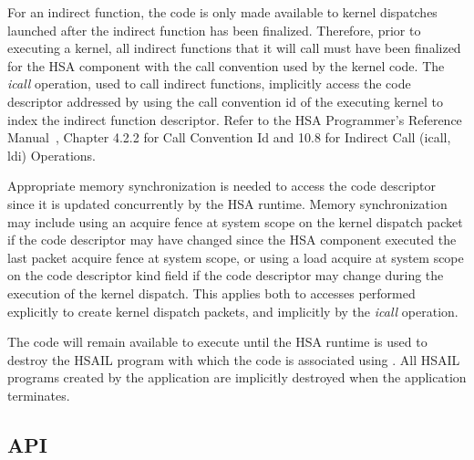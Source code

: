\documentclass[final]{book}
\newcommand{\reffld}[1]{\textit{#1}}
\begin{document}
For an indirect function, the code is only made available to kernel dispatches
launched after the indirect function has been finalized. Therefore, prior to
executing a kernel, all indirect functions that it will call must have been
finalized for the HSA component with the call convention used by the kernel
code. The \emph{icall} operation, used to call indirect functions, implicitly
access the code descriptor addressed by using the call convention id of the
executing kernel to index the indirect function descriptor. Refer to the HSA
Programmer's Reference Manual~\cite{prm}, Chapter 4.2.2 for Call Convention Id
and 10.8 for Indirect Call (icall, ldi) Operations.

Appropriate memory synchronization is needed to access the code descriptor since
it is updated concurrently by the HSA runtime. Memory synchronization may
include using an acquire fence at system scope on the kernel dispatch packet if
the code descriptor may have changed since the HSA component executed the last
packet acquire fence at system scope, or using a load acquire at system scope on
the code descriptor kind field if the code descriptor may change during the
execution of the kernel dispatch. This applies both to accesses performed
explicitly to create kernel dispatch packets, and implicitly by the \emph{icall}
operation.

The code will remain available to execute until the HSA runtime is used to
destroy the HSAIL program with which the code is associated using
. All HSAIL programs created by the application
are implicitly destroyed when the application terminates.

\subsection{API}




\end{document}
